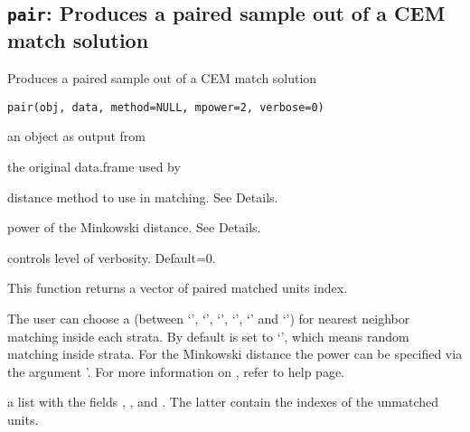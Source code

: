 \subsection{{\tt pair}: Produces a paired sample out of a CEM match solution}\label{ss:pair}
\begin{Description}\relax
Produces a paired sample out of a CEM match solution
\end{Description}
\begin{Usage}
\begin{verbatim}
pair(obj, data, method=NULL, mpower=2, verbose=0)
\end{verbatim}
\end{Usage}
\begin{Arguments}
\begin{ldescription}
\item[\code{obj}] an object as output from 
\item[\code{data}] the original data.frame used by 
\item[\code{method}] distance method to use in  matching. See Details.
\item[\code{mpower}] power of the Minkowski distance. See Details.
\item[\code{verbose}] controls level of verbosity. Default=0.
\end{ldescription}
\end{Arguments}
\begin{Details}\relax
This function returns a vector of paired matched units index.

The user can choose a  (between `',
`', `', `', `'
and `') for nearest neighbor matching inside each
 strata. By default  is set to `',
which means random matching inside  strata. For the Minkowski
distance the power can be specified via the argument '.
For more information on , refer to
 help page.
\end{Details}
\begin{Value}
\begin{ldescription}
\item[\code{obj}] a list with the fields , ,
 and . The latter contain the indexes
of the unmatched units.
\end{ldescription}
\end{Value}
